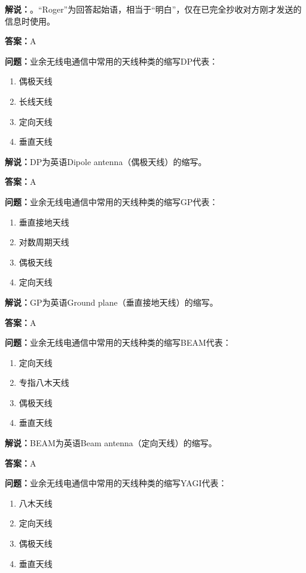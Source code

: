 \textbf{解说：}。“Roger”为回答起始语，相当于“明白”，仅在已完全抄收对方刚才发送的信息时使用。

\textbf{答案：}A

\textbf{问题：}业余无线电通信中常用的天线种类的缩写DP代表：

\begin{enumerate}[label=\Alph*), leftmargin=3em]
	\item 偶极天线
	\item 长线天线
	\item 定向天线
	\item 垂直天线
\end{enumerate}

\textbf{解说：}DP为英语Dipole antenna（偶极天线）的缩写。

\textbf{答案：}A

\textbf{问题：}业余无线电通信中常用的天线种类的缩写GP代表：

\begin{enumerate}[label=\Alph*), leftmargin=3em]
	\item 垂直接地天线
	\item 对数周期天线
	\item 偶极天线
	\item 定向天线
\end{enumerate}

\textbf{解说：}GP为英语Ground plane（垂直接地天线）的缩写。

\textbf{答案：}A

\textbf{问题：}业余无线电通信中常用的天线种类的缩写BEAM代表：

\begin{enumerate}[label=\Alph*), leftmargin=3em]
	\item 定向天线
	\item 专指八木天线
	\item 偶极天线
	\item 垂直天线
\end{enumerate}

\textbf{解说：}BEAM为英语Beam antenna（定向天线）的缩写。

\textbf{答案：}A

\textbf{问题：}业余无线电通信中常用的天线种类的缩写YAGI代表：

\begin{enumerate}[label=\Alph*), leftmargin=3em]
	\item 八木天线
	\item 定向天线
	\item 偶极天线
	\item 垂直天线
\end{enumerate}

